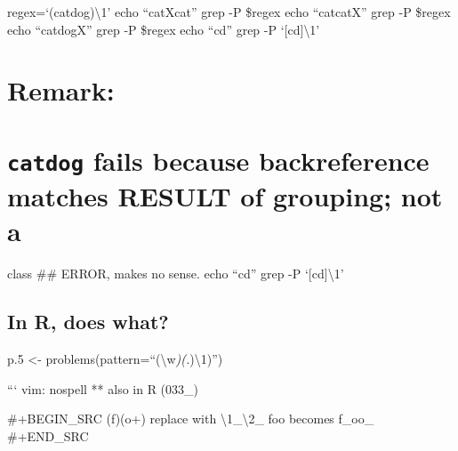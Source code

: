 \documentclass[
  letterpaper,
  DIV=11,
  numbers=noendperiod]{scrartcl}
\begin{document}
regex=`(cat\textbar dog)\textbackslash1' echo ``catXcat'' \textbar{}
grep -P \$regex echo ``catcatX'' \textbar{} grep -P \$regex echo
``catdogX'' \textbar{} grep -P \$regex echo ``cd'' \textbar{} grep -P
`{[}cd{]}\textbackslash1'

\section{Remark:}\label{remark}

\section{\texorpdfstring{\texttt{catdog} fails because backreference
matches RESULT of grouping; not
a}{catdog fails because backreference matches RESULT of grouping; not a}}\label{catdog-fails-because-backreference-matches-result-of-grouping-not-a}

class \#\# ERROR, makes no sense. echo ``cd'' \textbar{} grep -P
`{[}cd{]}\textbackslash1'

\subsection{In R, does what?}\label{in-r-does-what}

p.5 \textless-
problems(pattern=``(\textbackslash w\emph{)(.})\textbackslash1)'')

``` vim: nospell ** also in R (033\_)

\#+BEGIN\_SRC (f)(o+) replace with \textbackslash1\_\textbackslash2\_
foo becomes f\_oo\_ \#+END\_SRC
\end{document}
